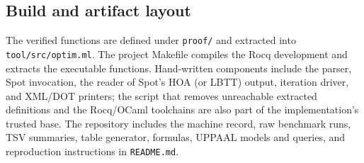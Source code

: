 \subsection{Build and artifact layout}\label{sec:layout}
The verified functions are defined under \texttt{proof/} and extracted into
\texttt{tool/src/optim.ml}. The project Makefile compiles the Rocq
development and extracts the executable functions. Hand-written components
include the parser, Spot invocation, the reader of Spot's HOA (or LBTT) output, iteration driver, and
XML/DOT printers; the script that removes unreachable extracted definitions
and the Rocq/OCaml toolchains are also part of the implementation's trusted
base. The repository includes the machine record, raw benchmark runs, TSV
summaries, table generator, formulas, UPPAAL models and queries, and
reproduction instructions in \texttt{README.md}.

